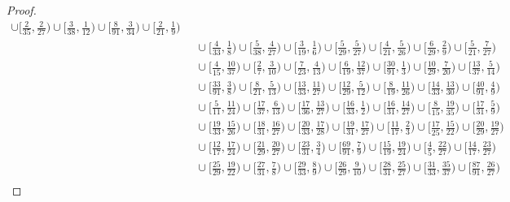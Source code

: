 \documentclass[a4paper,twoside]{article}
\numberwithin{equation}{section}
\renewcommand{\[}{\lfloor}
\renewcommand{\]}{\rfloor}
\newcommand{\<}{\langle}
\renewcommand{\>}{\rangle}
\begin{document}
\begin{proof}
\begin{align*}
\cup\bigl[\tfrac2{35},\tfrac2{27}\bigr)
\cup\bigl[\tfrac3{38},\tfrac1{12}\bigr)
\cup\bigl[\tfrac8{91},\tfrac3{34}\bigr)
\cup\bigl[\tfrac2{21},\tfrac19\bigr)
\\ &\;\;
\cup\bigl[\tfrac4{33},\tfrac18\bigr)
\cup\bigl[\tfrac5{38},\tfrac4{27}\bigr)
\cup\bigl[\tfrac3{19},\tfrac16\bigr)
\cup\bigl[\tfrac5{29},\tfrac5{27}\bigr)
\cup\bigl[\tfrac4{21},\tfrac5{26}\bigr)
\cup\bigl[\tfrac6{29},\tfrac29\bigr)
\cup\bigl[\tfrac5{21},\tfrac7{27}\bigr)
\\ &\;\;
\cup\bigl[\tfrac4{15},\tfrac{10}{37}\bigr)
\cup\bigl[\tfrac27,\tfrac3{10}\bigr)
\cup\bigl[\tfrac7{23},\tfrac4{13}\bigr)
\cup\bigl[\tfrac6{19},\tfrac{12}{37}\bigr)
\cup\bigl[\tfrac{30}{91},\tfrac13\bigr)
\cup\bigl[\tfrac{10}{29},\tfrac7{20}\bigr)
\cup\bigl[\tfrac{13}{37},\tfrac5{14}\bigr)
\\ &\;\;
\cup\bigl[\tfrac{33}{91},\tfrac38\bigr)
\cup\bigl[\tfrac8{21},\tfrac5{13}\bigr)
\cup\bigl[\tfrac{13}{33},\tfrac{11}{27}\bigr)
\cup\bigl[\tfrac{12}{29},\tfrac5{12}\bigr)
\cup\bigl[\tfrac8{19},\tfrac{11}{26}\bigr)
\cup\bigl[\tfrac{14}{33},\tfrac{13}{30}\bigr)
\cup\bigl[\tfrac{40}{91},\tfrac49\bigr)
\\ &\;\;
\cup\bigl[\tfrac5{11},\tfrac{11}{24}\bigr)
\cup\bigl[\tfrac{17}{37},\tfrac6{13}\bigr)
\cup\bigl[\tfrac{17}{36},\tfrac{13}{27}\bigr)
\cup\bigl[\tfrac{16}{33},\tfrac12\bigr)
\cup\bigl[\tfrac{16}{31},\tfrac{14}{27}\bigr)
\cup\bigl[\tfrac8{15},\tfrac{19}{35}\bigr)
\cup\bigl[\tfrac{17}{31},\tfrac59\bigr)
\\ &\;\;
\cup\bigl[\tfrac{19}{33},\tfrac{15}{26}\bigr)
\cup\bigl[\tfrac{18}{31},\tfrac{16}{27}\bigr)
\cup\bigl[\tfrac{20}{33},\tfrac{17}{28}\bigr)
\cup\bigl[\tfrac{19}{31},\tfrac{17}{27}\bigr)
\cup\bigl[\tfrac{11}{17},\tfrac23\bigr)
\cup\bigl[\tfrac{17}{25},\tfrac{15}{22}\bigr)
\cup\bigl[\tfrac{20}{29},\tfrac{19}{27}\bigr)
\\ &\;\;
\cup\bigl[\tfrac{12}{17},\tfrac{17}{24}\bigr)
\cup\bigl[\tfrac{21}{29},\tfrac{20}{27}\bigr)
\cup\bigl[\tfrac{23}{31},\tfrac34\bigr)
\cup\bigl[\tfrac{69}{91},\tfrac79\bigr)
\cup\bigl[\tfrac{15}{19},\tfrac{19}{24}\bigr)
\cup\bigl[\tfrac45,\tfrac{22}{27}\bigr)
\cup\bigl[\tfrac{14}{17},\tfrac{23}{27}\bigr)
\\ &\;\;
\cup\bigl[\tfrac{25}{29},\tfrac{19}{22}\bigr)
\cup\bigl[\tfrac{27}{31},\tfrac78\bigr)
\cup\bigl[\tfrac{29}{33},\tfrac89\bigr)
\cup\bigl[\tfrac{26}{29},\tfrac9{10}\bigr)
\cup\bigl[\tfrac{28}{31},\tfrac{25}{27}\bigr)
\cup\bigl[\tfrac{31}{33},\tfrac{35}{37}\bigr)
\cup\bigl[\tfrac{87}{91},\tfrac{26}{27}\bigr)
\\ &\;\;

\end{align*}
\end{proof}
\end{document}
